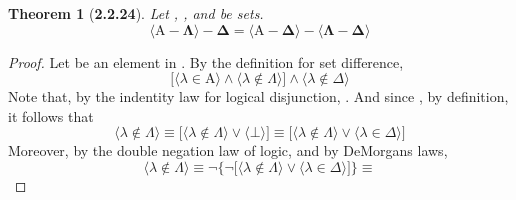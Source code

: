 \documentclass[a4paper, 12pt]{article}
\theoremstyle{plain}
\newtheorem*{theorem*}{Theorem}
\begin{document}
\begin{theorem*}[\textbf{2.2.24}] \color{black}
    Let , \bm{$\Lambda$}, and \bm{$\Delta$} be sets. 
    \begin{equation*}
        \bm{
            \Big \langle \mathrm{A} - \Lambda \Big \rangle - \Delta 
                = 
            \Big \langle \mathrm{A} - \Delta \Big \rangle 
                - 
            \Big \langle \Lambda - \Delta \Big \rangle
        }
    \end{equation*}
\end{theorem*}
\begin{proof} \color{black}
    Let \bm{$\lambda$} be an element in 
    . 
    By the definition for set difference,
    \begin{equation*} %
        \bigg[
            \Big \langle \lambda \in \mathrm{A} \Big \rangle
                \land
            \Big \langle \lambda \notin \Lambda \Big \rangle
        \bigg]
            \land
        \Big \langle \lambda \notin \Delta \Big \rangle
    \end{equation*}
    Note that, by the indentity law for logical disjunction, 
    \bm{$
    \lambda \notin \Lambda
        \equiv 
    \lambda \notin \Lambda
        \lor 
    \bot
    $}.
    And since
    \bm{$
    \lambda \in \Delta
        \equiv 
    \bot
    $},
    by definition,
    it follows that
    \begin{equation*} %
        \Big \langle \lambda \notin \Lambda \Big \rangle
            \equiv
        \bigg[
            \Big \langle \lambda \notin \Lambda \Big \rangle
                \lor
            \Big \langle \bot \Big \rangle
        \bigg]
            \equiv
        \bigg[
            \Big \langle \lambda \notin \Lambda \Big \rangle
                \lor
            \Big \langle \lambda \in \Delta \Big \rangle
        \bigg]
    \end{equation*}
    Moreover, by the double negation law of logic, and by DeMorgans laws,
    \begin{equation*} %
        \Big \langle \lambda \notin \Lambda \Big \rangle
            \equiv
        \lnot \Bigg\{
            \lnot \bigg[
                \Big \langle \lambda \notin \Lambda \Big \rangle
                    \lor
                \Big \langle \lambda \in \Delta \Big \rangle
            \bigg]
        \Bigg\}
            \equiv

\end{equation*}
\end{proof}
\end{document}
